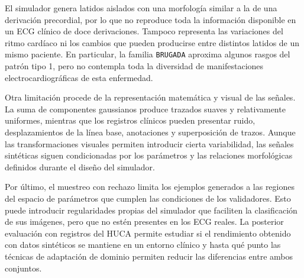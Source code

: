 El simulador genera latidos aislados con una morfología similar a la de una derivación precordial, por lo que no reproduce toda la información disponible en un ECG clínico de doce derivaciones. Tampoco representa las variaciones del ritmo cardíaco ni los cambios que pueden producirse entre distintos latidos de un mismo paciente. En particular, la familia \texttt{BRUGADA} aproxima algunos rasgos del patrón tipo 1, pero no contempla toda la diversidad de manifestaciones electrocardiográficas de esta enfermedad.

Otra limitación procede de la representación matemática y visual de las señales. La suma de componentes gaussianos produce trazados suaves y relativamente uniformes, mientras que los registros clínicos pueden presentar ruido, desplazamientos de la línea base, anotaciones y superposición de trazos. Aunque las transformaciones visuales permiten introducir cierta variabilidad, las señales sintéticas siguen condicionadas por los parámetros y las relaciones morfológicas definidos durante el diseño del simulador.

Por último, el muestreo con rechazo limita los ejemplos generados a las regiones del espacio de parámetros que cumplen las condiciones de los validadores. Esto puede introducir regularidades propias del simulador que faciliten la clasificación de sus imágenes, pero que no estén presentes en los ECG reales. La posterior evaluación con registros del HUCA permite estudiar si el rendimiento obtenido con datos sintéticos se mantiene en un entorno clínico y hasta qué punto las técnicas de adaptación de dominio permiten reducir las diferencias entre ambos conjuntos.
